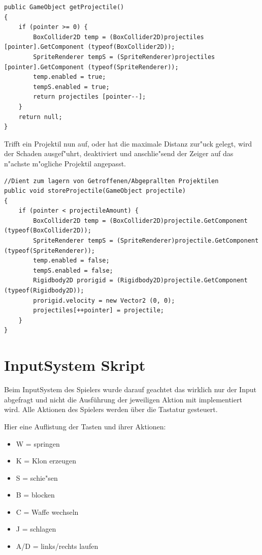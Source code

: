 \begin{lstlisting}[breaklines=true]
public GameObject getProjectile()
{
	if (pointer >= 0) {
		BoxCollider2D temp = (BoxCollider2D)projectiles [pointer].GetComponent (typeof(BoxCollider2D));
		SpriteRenderer tempS = (SpriteRenderer)projectiles [pointer].GetComponent (typeof(SpriteRenderer));
		temp.enabled = true;
		tempS.enabled = true;
		return projectiles [pointer--];
	}
	return null;
}
\end{lstlisting}

Trifft ein Projektil nun auf, oder hat die maximale Distanz zur"uck gelegt, wird der Schaden ausgef"uhrt, deaktiviert und anschlie"send der Zeiger auf das n"achste m"ogliche Projektil  angepasst.

\begin{lstlisting}[breaklines=true]
//Dient zum lagern von Getroffenen/Abgeprallten Projektilen
public void storeProjectile(GameObject projectile)
{
	if (pointer < projectileAmount) {
		BoxCollider2D temp = (BoxCollider2D)projectile.GetComponent (typeof(BoxCollider2D));
		SpriteRenderer tempS = (SpriteRenderer)projectile.GetComponent (typeof(SpriteRenderer));
		temp.enabled = false;
		tempS.enabled = false;
		Rigidbody2D prorigid = (Rigidbody2D)projectile.GetComponent (typeof(Rigidbody2D));
		prorigid.velocity = new Vector2 (0, 0);
		projectiles[++pointer] = projectile;
	}
}
\end{lstlisting}

\section{InputSystem Skript}
Beim InputSystem des Spielers wurde darauf geachtet das wirklich nur der Input abgefragt und nicht die Ausführung der jeweiligen Aktion mit implementiert wird. Alle Aktionen des Spielers werden über die Tastatur gesteuert.

Hier eine Auflistung der Tasten und ihrer Aktionen:

\begin{itemize}
	\item W = springen
	\item K = Klon erzeugen
	\item S = schie"sen
	\item B = blocken
	\item C = Waffe wechseln
	\item J = schlagen
	\item A/D = links/rechts laufen
\end{itemize}

